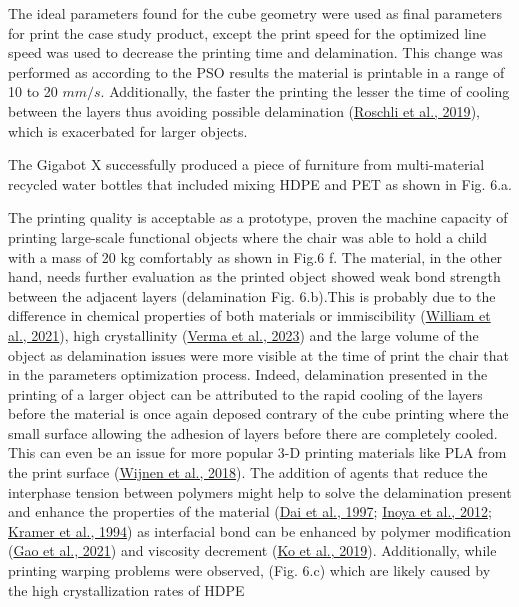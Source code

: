 \documentclass[
  12pt,
  number,
  review]{elsarticle}
\begin{document}
The ideal parameters found for the cube geometry were used as final
parameters for print the case study product, except the print speed for
the optimized line speed was used to decrease the printing time and
delamination. This change was performed as according to the PSO results
the material is printable in a range of 10 to 20 \(mm/s\). Additionally,
the faster the printing the lesser the time of cooling between the
layers thus avoiding possible delamination
(\protect\hyperlink{ref-roschli2019}{Roschli et al., 2019}), which is
exacerbated for larger objects.

The Gigabot X successfully produced a piece of furniture from
multi-material recycled water bottles that included mixing HDPE and PET
as shown in Fig. 6.a.

The printing quality is acceptable as a prototype, proven the machine
capacity of printing large-scale functional objects where the chair was
able to hold a child with a mass of 20 kg comfortably as shown in Fig.6
f. The material, in the other hand, needs further evaluation as the
printed object showed weak bond strength between the adjacent layers
(delamination Fig. 6.b).This is probably due to the difference in
chemical properties of both materials or immiscibility
(\protect\hyperlink{ref-william2021}{William et al., 2021}), high
crystallinity (\protect\hyperlink{ref-verma2023}{Verma et al., 2023})
and the large volume of the object as delamination issues were more
visible at the time of print the chair that in the parameters
optimization process. Indeed, delamination presented in the printing of
a larger object can be attributed to the rapid cooling of the layers
before the material is once again deposed contrary of the cube printing
where the small surface allowing the adhesion of layers before there are
completely cooled. This can even be an issue for more popular 3-D
printing materials like PLA from the print surface
(\protect\hyperlink{ref-wijnen2018}{Wijnen et al., 2018}). The addition
of agents that reduce the interphase tension between polymers might help
to solve the delamination present and enhance the properties of the
material (\protect\hyperlink{ref-dai1997}{Dai et al., 1997};
\protect\hyperlink{ref-inoya2012}{Inoya et al., 2012};
\protect\hyperlink{ref-kramer1994}{Kramer et al., 1994}) as interfacial
bond can be enhanced by polymer modification
(\protect\hyperlink{ref-gao2021}{Gao et al., 2021}) and viscosity
decrement (\protect\hyperlink{ref-ko2019}{Ko et al., 2019}).
Additionally, while printing warping problems were observed, (Fig. 6.c)
which are likely caused by the high crystallization rates of HDPE
\end{document}
